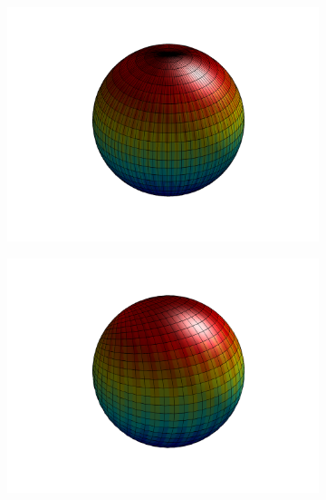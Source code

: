 \begin{figure}
\label{fig::Sn_Y1}
\centering
	\begin{subfigure}[b]{0.45\textwidth}
		\centering
		\includegraphics[width=\textwidth]{figures/appendices/Y_1_0.png}
		\caption{}
	\end{subfigure}
	\vfill
	\begin{subfigure}[b]{0.40\textwidth}
		\centering
		\includegraphics[width=\textwidth]{figures/appendices/Y_1_-1.png}
		\caption{}
	\end{subfigure}
	\hfill
	\begin{subfigure}[b]{0.40\textwidth}
		\centering

\end{subfigure}
\end{figure}
